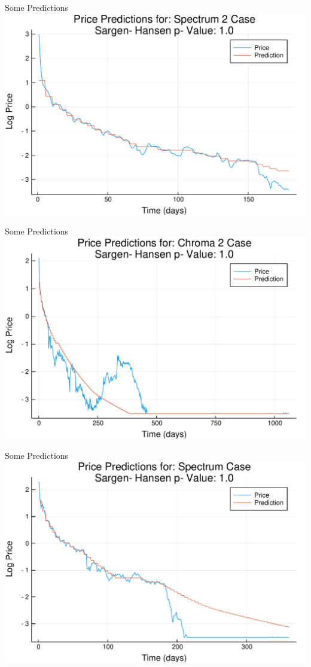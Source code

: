 \documentclass[bigger]{beamer}
\begin{document}
\begin{frame}[label=sec-1-23]{Some Predictions}
\includegraphics[width=.9\linewidth]{../Plots/Cases/Cases/Spectrum2Case.pdf}
\end{frame}

\begin{frame}[label=sec-1-24]{Some Predictions}
\includegraphics[width=.9\linewidth]{../Plots/Cases/Cases/Chroma2Case.pdf}
\end{frame}

\begin{frame}[label=sec-1-25]{Some Predictions}
\includegraphics[width=.9\linewidth]{../Plots/Cases/Cases/SpectrumCase.pdf}
\end{frame}
\end{document}
